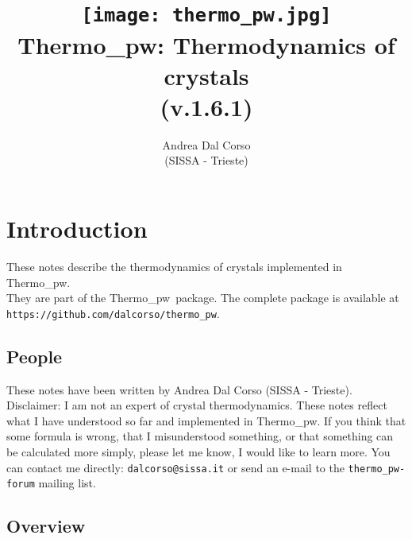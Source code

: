\documentclass[12pt,a4paper,twoside]{report}
\def\version{1.6.1}
\def\tpw{{\sc Thermo\_pw}}
\begin{document}
 

\author{Andrea Dal Corso \\ (SISSA - Trieste)}
\date{}

\title{
  \texttt{[image: thermo\_pw.jpg]} \\
  \vspace{3truecm}
  \Huge \color{dark-blue} {\sc Thermo\_pw}: Thermodynamics of crystals \\(v.\version)
}

\maketitle

\newpage

{\color{dark-blue}\tableofcontents}
\color{black}

\newpage

{\color{dark-blue}\chapter{Introduction}}
\color{black}

These notes describe the thermodynamics of crystals implemented in \tpw. \\
They are part of the \tpw\ package. The complete package is
available at \texttt{https://github.com/dalcorso/thermo\_pw}.

\newpage
{\color{coral}\section{People}}
\color{black}

These notes have been written by Andrea Dal Corso (SISSA - Trieste). \\
Disclaimer: I am not an expert of crystal thermodynamics. 
These notes reflect what I have understood so far and implemented in 
\tpw. If you think that some formula is wrong, 
that I misunderstood something, or that something can be calculated more 
simply, please let me know, I would like to learn more. 
You can contact me directly: \texttt{dalcorso@sissa.it} or send an
e-mail to the \texttt{thermo\_pw-forum} mailing list.

\newpage
{\color{coral}\section{Overview}}
\color{black}
\end{document}
